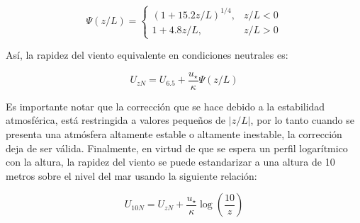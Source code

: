 \documentclass[11pt]{article}
\begin{document}
\begin{equation}
  \Psi(z/L) = \left\{
    \begin{array}{cc}
      (1 + 15.2 z/L)^{1/4}, & z/L < 0 \\
      1 + 4.8 z/L,          & z/L > 0
    \end{array}  
  \right.
\end{equation}

Así, la rapidez del viento equivalente en condiciones neutrales es:

\begin{equation}
  U_{zN} = U_{6.5} + \frac{u_\star}{\kappa}  \Psi (z/L)
\end{equation}

Es importante notar que la corrección que se hace debido a la estabilidad
atmosférica, está restringida a valores pequeños de $|z/L|$, por lo tanto cuando
se presenta una atmósfera altamente estable o altamente inestable, la corrección
deja de ser válida. Finalmente, en virtud de que se espera un perfil logarítmico
con la altura, la rapidez del viento se puede estandarizar a una altura de 10
metros sobre el nivel del mar usando la siguiente relación:

\begin{equation}
  U_{10N} = U_{zN} + \frac{u_\star}{\kappa} \log\left(\frac{10}{z}\right)
\end{equation}




\end{document}
